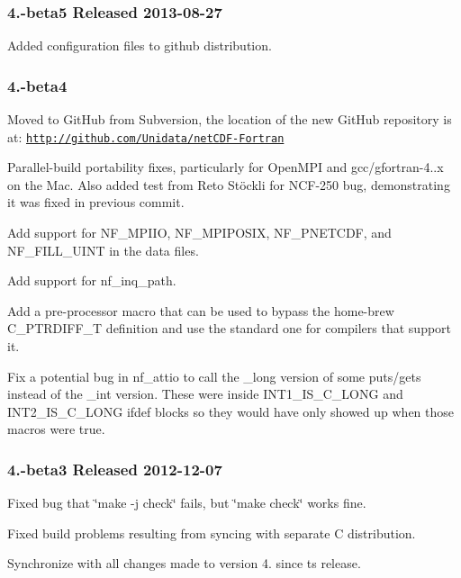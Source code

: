 \subsubsection*{4.-\/beta5 Released 2013-\/08-\/27}


\begin{DoxyItemize}
\item Added configuration files to github distribution.
\end{DoxyItemize}

\subsubsection*{4.-\/beta4}


\begin{DoxyItemize}
\item Moved to Git\+Hub from Subversion, the location of the new Git\+Hub repository is at\+: \href{http://github.com/Unidata/netCDF-Fortran}{\tt http\+://github.\+com/\+Unidata/net\+C\+D\+F-\/\+Fortran}
\item Parallel-\/build portability fixes, particularly for Open\+M\+PI and gcc/gfortran-\/4..\+x on the Mac. Also added test from Reto Stöckli for N\+C\+F-\/250 bug, demonstrating it was fixed in previous commit.
\item Add support for N\+F\+\_\+\+M\+P\+I\+IO, N\+F\+\_\+\+M\+P\+I\+P\+O\+S\+IX, N\+F\+\_\+\+P\+N\+E\+T\+C\+DF, and N\+F\+\_\+\+F\+I\+L\+L\+\_\+\+U\+I\+NT in the data files.
\item Add support for nf\+\_\+inq\+\_\+path.
\item Add a pre-\/processor macro that can be used to bypass the home-\/brew C\+\_\+\+P\+T\+R\+D\+I\+F\+F\+\_\+T definition and use the standard one for compilers that support it.
\item Fix a potential bug in nf\+\_\+attio to call the \+\_\+long version of some puts/gets instead of the \+\_\+int version. These were inside I\+N\+T1\+\_\+\+I\+S\+\_\+\+C\+\_\+\+L\+O\+NG and I\+N\+T2\+\_\+\+I\+S\+\_\+\+C\+\_\+\+L\+O\+NG ifdef blocks so they would have only showed up when those macros were true.
\end{DoxyItemize}

\subsubsection*{4.-\/beta3 Released 2012-\/12-\/07}


\begin{DoxyItemize}
\item Fixed bug that \char`\"{}make -\/j check\char`\"{} fails, but \char`\"{}make check\char`\"{} works fine.
\item Fixed build problems resulting from syncing with separate C distribution.
\item Synchronize with all changes made to version 4. since ts release.
\end{DoxyItemize}

